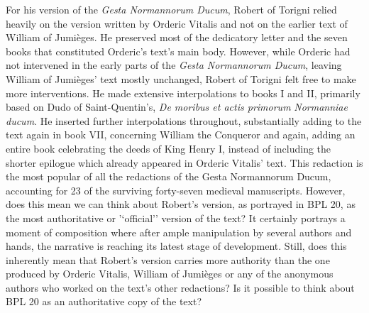 \documentclass{article}
\begin{document}
For his version of the \emph{Gesta Normannorum Ducum}, Robert of Torigni
relied heavily on the version written by Orderic Vitalis and not on the
earlier text of William of Jumièges. He preserved most of the dedicatory
letter and the seven books that constituted Orderic's text's main body.
However, while Orderic had not intervened in the early parts of the
\emph{Gesta Normannorum Ducum}, leaving William of Jumièges' text mostly
unchanged, Robert of Torigni felt free to make more interventions. He
made extensive interpolations to books I and II, primarily based on Dudo
of Saint-Quentin's, \emph{De moribus et actis primorum} \emph{Normanniae
ducum}. He inserted further interpolations throughout, substantially
adding to the text again in book VII, concerning William the Conqueror
\citep[lxxxii]{van_houts_gesta_1992} and again, adding an entire book celebrating
the deeds of King Henry I, instead of including the shorter epilogue
which already appeared in Orderic Vitalis' text. This redaction is the
most popular of all the redactions of the Gesta Normannorum Ducum,
accounting for 23 of the surviving forty-seven medieval manuscripts.
However, does this mean we can think about Robert's version, as
portrayed in BPL 20, as the most authoritative or '`official'' version of
the text? It certainly portrays a moment of composition where after ample
manipulation by several authors and hands, the narrative is reaching its
latest stage of development. Still, does this inherently mean that Robert's
version carries more authority than the one produced by Orderic Vitalis,
William of Jumièges or any of the anonymous authors who worked on the
text's other redactions? Is it possible to think about BPL 20 as an
authoritative copy of the text?
\end{document}
